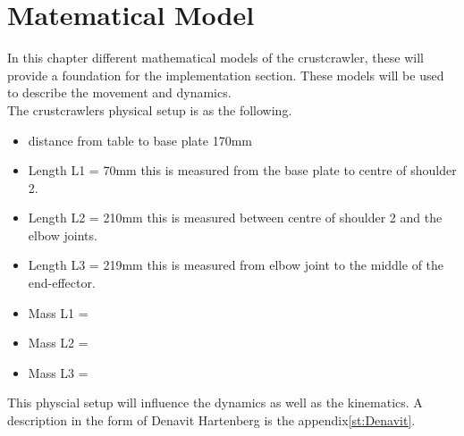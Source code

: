 \chapter{Matematical Model}\label{ch:MatematicalModel}
In this chapter different mathematical models of the crustcrawler, these will provide a foundation for the implementation section. These models will be used to describe the movement and dynamics.\\
The crustcrawlers physical setup is as the following.
\begin{itemize}
    \item distance from table to base plate 170mm
    \item Length L1 = 70mm  this is measured from the base plate to centre of shoulder 2.
    \item Length L2 = 210mm this is measured between centre of shoulder 2 and the elbow joints.
    \item Length L3 = 219mm this is measured from elbow joint to the middle of the end-effector.
    \item Mass L1 = 
    \item Mass L2 =
    \item Mass L3 =
\end{itemize}

This physcial setup will influence the dynamics as well as the kinematics. A description in the form of Denavit Hartenberg is the appendix\ref{st:Denavit}.

